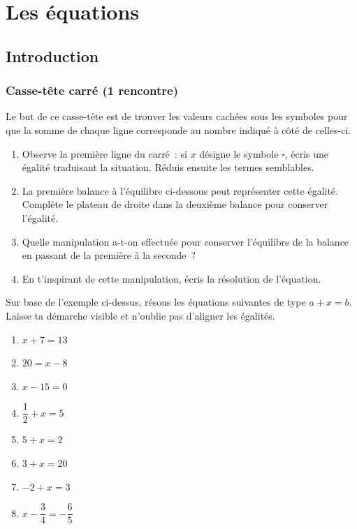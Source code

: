 \documentclass[../../syllabus_2.tex]{subfiles}
\begin{document}
\chapter{Les équations}

\section{Introduction}
\subsection{Casse-tête carré (1\iere{} rencontre)}
\begin{center}
  
\end{center}

Le but de ce casse-tête est de trouver les valeurs cachées sous les
symboles pour que la somme de chaque ligne corresponde au nombre indiqué à côté de celles-ci.

\begin{enumerate}
  \item Observe la première ligne du carré~: si $x$ désigne le symbole $\square$, écris une égalité traduisant la situation. Réduis ensuite les termes
        semblables.\vspace*{2cm}
  \item La première balance à l'équilibre ci-dessous peut représenter cette égalité. Complète le plateau de droite dans la deuxième balance pour
        conserver l'égalité.
        \begin{center}
          \hfil
        \end{center}
  \item
        Quelle manipulation a-t-on effectuée pour conserver l'équilibre de la balance en passant de la première à la seconde~?
  \item
        En t'inspirant de cette manipulation, écris la résolution de l'équation.
        \vspace*{3cm}
\end{enumerate}

\begin{exercise}
  Sur base de l'exemple ci-dessus, résous les équations suivantes de type
  $a+x=b$. Laisse ta démarche visible et n'oublie pas d'aligner les égalités.
  \begin{enumerate}[cols=2, itemsep=3cm]
    \item $x + 7 = 13$
    \item $20 = x - 8$
    \item $x - 15 = 0$
    \item $\dfrac{1}{2} + x = 5$
    \item $5 + x = 2$
    \item $3 + x = 20$
    \item $-2 + x = 3$
    \item $ x -\dfrac{3}{4} = -\dfrac{6}{5}$
  \end{enumerate}
  \vspace*{3cm}
\end{exercise}
\end{document}
